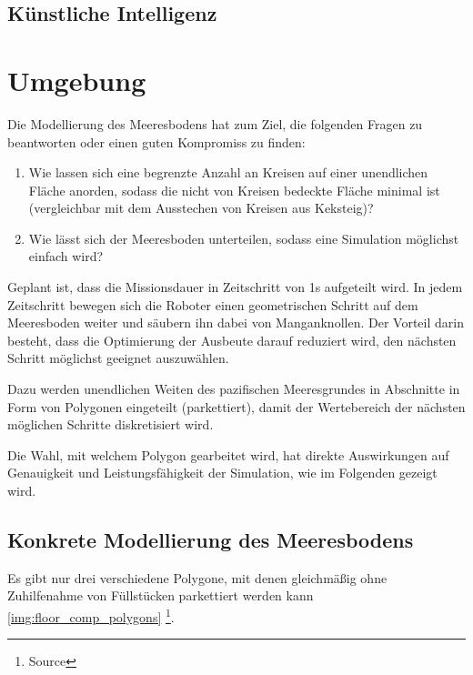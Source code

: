 \documentclass{article}
\newcounter{ga}\setcounter{ga}{1}
\begin{document}
\subsection{Künstliche Intelligenz}



\clearpage
\section{Umgebung}

Die Modellierung des Meeresbodens hat zum Ziel, die folgenden 
Fragen zu beantworten oder einen guten Kompromiss zu finden:

\begin{enumerate}
\item Wie lassen sich eine begrenzte Anzahl an Kreisen auf einer 
unendlichen Fläche anorden, sodass die nicht von Kreisen bedeckte Fläche minimal 
ist (vergleichbar mit dem Ausstechen von Kreisen aus Keksteig)?
\item Wie lässt sich der Meeresboden unterteilen, sodass eine Simulation
möglichst einfach wird?
\end{enumerate}

Geplant ist, dass die Missionsdauer in Zeitschritt von 1s aufgeteilt wird.
In jedem Zeitschritt bewegen sich die Roboter einen geometrischen Schritt
auf dem Meeresboden weiter und säubern ihn dabei von Manganknollen. Der Vorteil
darin besteht, dass die Optimierung der Ausbeute darauf reduziert wird, 
den nächsten Schritt möglichst geeignet auszuwählen.

Dazu werden unendlichen Weiten des pazifischen Meeresgrundes
in Abschnitte in Form von Polygonen eingeteilt (parkettiert),
damit der Wertebereich der nächsten möglichen Schritte diskretisiert wird.

Die Wahl, mit welchem Polygon gearbeitet wird, hat direkte
Auswirkungen auf Genauigkeit und Leistungsfähigkeit der 
Simulation, wie im Folgenden gezeigt wird.

\subsection{Konkrete Modellierung des Meeresbodens}

Es gibt nur drei verschiedene Polygone, mit denen gleichmäßig
ohne Zuhilfenahme von Füllstücken parkettiert werden kann 
\ref{img:floor_comp_polygons} \footnote{Source}.
\end{document}
